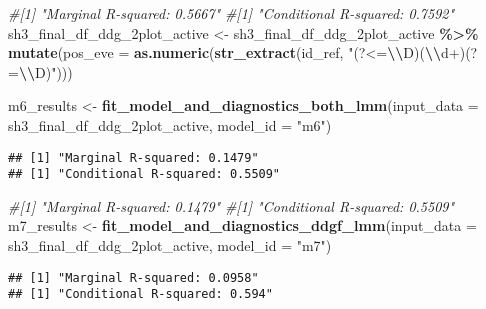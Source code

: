 \documentclass[
]{article}
\newenvironment{Shaded}{\begin{snugshade}}{\end{snugshade}}
\newcommand{\AttributeTok}[1]{\textcolor[rgb]{0.13,0.29,0.53}{#1}}
\newcommand{\CommentTok}[1]{\textcolor[rgb]{0.56,0.35,0.01}{\textit{#1}}}
\newcommand{\FunctionTok}[1]{\textcolor[rgb]{0.13,0.29,0.53}{\textbf{#1}}}
\newcommand{\NormalTok}[1]{#1}
\newcommand{\OtherTok}[1]{\textcolor[rgb]{0.56,0.35,0.01}{#1}}
\newcommand{\SpecialCharTok}[1]{\textcolor[rgb]{0.81,0.36,0.00}{\textbf{#1}}}
\newcommand{\StringTok}[1]{\textcolor[rgb]{0.31,0.60,0.02}{#1}}
\begin{document}
\begin{Shaded}
\begin{Highlighting}[]
\CommentTok{\#[1] "Marginal R{-}squared: 0.5667"}
\CommentTok{\#[1] "Conditional R{-}squared: 0.7592"}
\NormalTok{sh3\_final\_df\_ddg\_2plot\_active }\OtherTok{\textless{}{-}}\NormalTok{ sh3\_final\_df\_ddg\_2plot\_active }\SpecialCharTok{\%\textgreater{}\%}
  \FunctionTok{mutate}\NormalTok{(}\AttributeTok{pos\_eve =} \FunctionTok{as.numeric}\NormalTok{(}\FunctionTok{str\_extract}\NormalTok{(id\_ref, }\StringTok{"(?\textless{}=}\SpecialCharTok{\textbackslash{}\textbackslash{}}\StringTok{D)(}\SpecialCharTok{\textbackslash{}\textbackslash{}}\StringTok{d+)(?=}\SpecialCharTok{\textbackslash{}\textbackslash{}}\StringTok{D)"}\NormalTok{)))}

\NormalTok{m6\_results }\OtherTok{\textless{}{-}} \FunctionTok{fit\_model\_and\_diagnostics\_both\_lmm}\NormalTok{(}\AttributeTok{input\_data =}\NormalTok{ sh3\_final\_df\_ddg\_2plot\_active, }\AttributeTok{model\_id =} \StringTok{"m6"}\NormalTok{)}
\end{Highlighting}
\end{Shaded}

\begin{verbatim}
## [1] "Marginal R-squared: 0.1479"
## [1] "Conditional R-squared: 0.5509"
\end{verbatim}

\begin{Shaded}
\begin{Highlighting}[]
\CommentTok{\#[1] "Marginal R{-}squared: 0.1479"}
\CommentTok{\#[1] "Conditional R{-}squared: 0.5509"}
\NormalTok{m7\_results }\OtherTok{\textless{}{-}} \FunctionTok{fit\_model\_and\_diagnostics\_ddgf\_lmm}\NormalTok{(}\AttributeTok{input\_data =}\NormalTok{ sh3\_final\_df\_ddg\_2plot\_active, }\AttributeTok{model\_id =} \StringTok{"m7"}\NormalTok{)}
\end{Highlighting}
\end{Shaded}

\begin{verbatim}
## [1] "Marginal R-squared: 0.0958"
## [1] "Conditional R-squared: 0.594"
\end{verbatim}

\begin{Shaded}
\end{Shaded}
\end{document}
